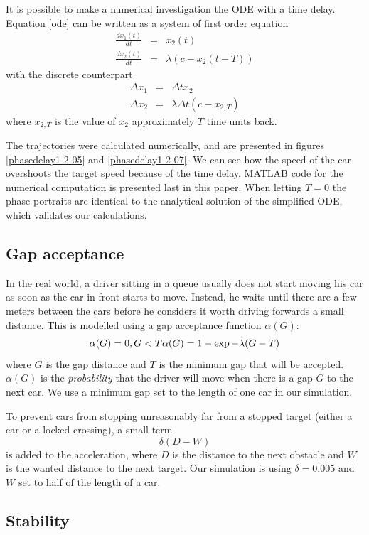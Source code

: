\documentclass[11pt,a4paper]{article}
\begin{document}
It is possible to make a numerical investigation the ODE with a time delay.
Equation \ref{ode} can be written as a system of first order equation
\begin{eqnarray*}
\frac{dx_1(t)}{dt} &=& x_2(t) \\
\frac{dx_2(t)}{dt} &=& \lambda \left( c - x_2(t-T) \right)
\end{eqnarray*}
with the discrete counterpart
\begin{eqnarray*}
\Delta x_1 &=& \Delta t x_2 \\
\Delta x_2 &=& \lambda \Delta t ( c - x_{2,T})
\end{eqnarray*}
where $x_{2,T}$ is the value of $x_2$ approximately $T$ time units back.

The trajectories were calculated numerically, and are presented in figures
\ref{phasedelay1-2-05} and \ref{phasedelay1-2-07}. We can see how the speed of
the car overshoots the target speed because of the time delay. MATLAB code for
the numerical computation is presented last in this paper. When letting $T=0$
the phase portraits are identical to the analytical solution of the simplified
ODE, which validates our calculations.

\subsection{Gap acceptance}
In the real world, a driver sitting in a queue usually does not start moving his car as
soon as the car in front starts to move. Instead, he waits until there are a few meters
between the cars before he considers it worth driving forwards a small distance.
This is modelled using a gap acceptance function $\alpha(G)$:
\[ \alpha(G) = 0, G < T\\
\alpha(G) = 1 - \exp{-\lambda(G - T)} \]
where $G$ is the gap distance and $T$ is the minimum gap that will be accepted.
$\alpha(G)$ is the \emph{probability} that the driver will move when there is a gap $G$
to the next car. We use a minimum gap set to the length of one car in our simulation.

To prevent cars from stopping unreasonably far from a stopped target (either a car or a
locked crossing), a small term \[ \delta (D - W) \] is added to the acceleration,
where $D$ is the distance to the next obstacle and $W$ is the wanted distance to the next target.
Our simulation is using $\delta = 0.005$ and $W$ set to half of the length of a car.

\subsection{Stability}
\end{document}

